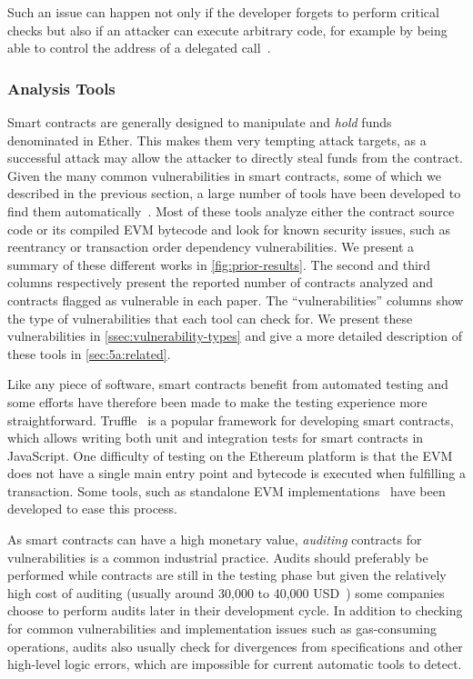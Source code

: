 Such an issue can happen not only if the developer forgets to perform critical checks but also if an attacker can execute arbitrary code, for example by being able to control the address of a delegated call~\cite{Krupp2018}.



\subsubsection{Analysis Tools}
\label{ssec:analysis-tools}
Smart contracts are generally designed to manipulate and \emph{hold} funds denominated in Ether. This makes them very tempting attack targets, as a successful attack may allow the attacker to directly steal funds from the contract.
Given the many common vulnerabilities in smart contracts, some of which we described in the previous section, a large number of tools have been developed to find them automatically~\cite{Luu2016a,Tsankov2018,mythril}.
Most of these tools analyze either the contract source code or its compiled EVM bytecode and look for known security issues, such as reentrancy or transaction order dependency vulnerabilities. We present a summary of these different works in \autoref{fig:prior-results}. The second and third columns respectively present the reported number of contracts analyzed and contracts flagged as vulnerable in each paper. The ``vulnerabilities'' columns show the type of vulnerabilities that each tool can check for. We present these vulnerabilities in \autoref{ssec:vulnerability-types} and give a more detailed description of these tools in \autoref{sec:5a:related}.

Like any piece of software, smart contracts benefit from automated testing and some efforts have therefore been made to make the testing experience more straightforward. Truffle~\cite{truffle} is a popular framework for developing smart contracts, which allows writing both unit and integration tests for smart contracts in JavaScript. One difficulty of testing on the Ethereum platform is that the EVM does not have a single main entry point and bytecode is executed when fulfilling a transaction. Some tools, such as standalone EVM implementations~\cite{ganache} have been developed to ease this process.

As smart contracts can have a high monetary value, \emph{auditing} contracts for vulnerabilities is a common industrial practice.
Audits should preferably be performed while contracts are still in the testing phase but given the relatively high cost of auditing (usually around 30,000 to 40,000 USD~\cite{solidified}) some companies choose to perform audits later in their development cycle. In addition to checking for common vulnerabilities and implementation issues such as gas-consuming operations, audits also usually check for divergences from specifications and other high-level logic errors, which are impossible for current automatic tools to detect.

